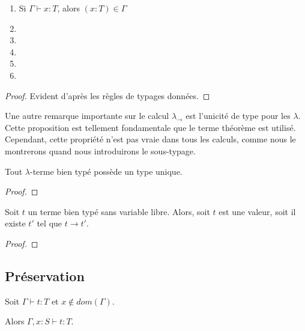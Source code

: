 \begin{lemma} 
  \begin{enumerate}
    \item Si $\Gamma \vdash x : T$, alors $(x : T) \in \Gamma$
    \item 
    \item 
    \item 
    \item 
    \item 
  \end{enumerate}
\end{lemma}
  
\begin{proof}
  Evident d'après les règles de typages données.
\end{proof}

Une autre remarque importante sur le calcul $\lambda_{\rightarrow}$ est
l'unicité de type pour les $\lambda$. Cette proposition est tellement
fondamentale que le terme théorème est utilisé. Cependant, cette propriété n'est
pas vraie dans tous les calculs, comme nous le montrerons quand nous
introduirons le sous-typage.

\begin{theorem}
  Tout $\lambda$-terme bien typé possède un type unique.
\end{theorem}

\begin{proof}
  
\end{proof}

\begin{theorem} 
  Soit $t$ un terme bien typé sans variable libre. Alors, soit $t$ est une
  valeur, soit il existe $t'$ tel que $t \rightarrow t'$.
\end{theorem}

\begin{proof}
  
\end{proof}

\subsection*{Préservation}

\begin{lemma} [d'affaiblissement]
  Soit $\Gamma \vdash t : T$ et $x \notin dom(\Gamma)$.

  Alors $\Gamma, x : S \vdash t : T$.
\end{lemma}

